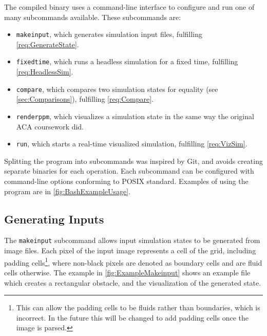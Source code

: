 The compiled binary uses a command-line interface to configure and run one of many subcommands available.
These subcommands are:\label{sec:DesignSubcommands}
\begin{itemize}
    \item \texttt{makeinput}, which generates simulation input files, fulfilling \cref{req:GenerateState}.
    \item \texttt{fixedtime}, which runs a headless simulation for a fixed time, fulfilling \cref{req:HeadlessSim}.
    \item \texttt{compare}, which compares two simulation states for equality (see \cref{sec:Comparisons}), fulfilling \cref{req:Compare}.
    \item \texttt{renderppm}, which visualizes a simulation state in the same way the original ACA coursework did.
    \item \texttt{run}, which starts a real-time visualized simulation, fulfilling \cref{req:VizSim}.
\end{itemize}
Splitting the program into subcommands was inspired by Git\cite{tool:Git}, and avoids creating separate binaries for each operation.
Each subcommand can be configured with command-line options conforming to POSIX standard\cite{IEEE2018UtilityConventions}.
Examples of using the program are in \cref{fig:BashExampleUsage}.


\subsection{Generating Inputs}
The \texttt{makeinput} subcommand allows input simulation states to be generated from image files.
Each pixel of the input image represents a cell of the grid, including padding cells\footnote{This can allow the padding cells to be fluids rather than boundaries, which is incorrect. In the future this will be changed to add padding cells once the image is parsed.}, where non-black pixels are denoted as boundary cells and are fluid cells otherwise.
The example in \cref{fig:ExampleMakeinput} shows an example file which creates a rectangular obstacle, and the visualization of the generated state.


